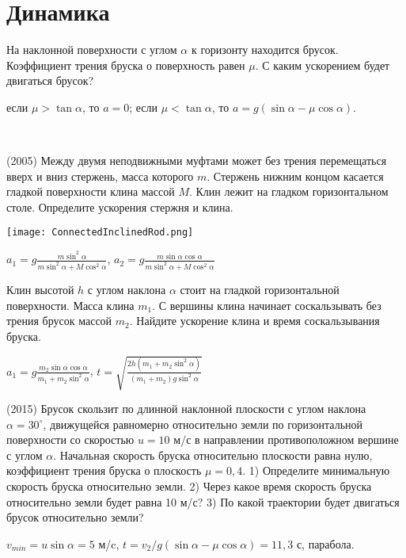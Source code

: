 \section{Динамика}
 
\begin{ex}
На наклонной поверхности с углом $\alpha$ к горизонту находится брусок. 
Коэффициент трения бруска о поверхность равен $\mu$. С каким ускорением будет двигаться брусок?
\begin{ans}
если $\mu > \tan \alpha$, то $a = 0$; если $\mu < \tan \alpha$, то $a = g(\sin \alpha - \mu \cos \alpha)$.
\end{ans}
\end{ex}

\begin{ex}
\hspace{0pt} \\
\begin{minipage}{.65\textwidth}
(2005) Между двумя неподвижными муфтами может без трения перемещаться вверх и вниз стержень, масса которого $m$. Стержень нижним концом касается гладкой поверхности клина массой $M$. Клин лежит на гладком горизонтальном столе. Определите ускорения стержня и клина.
\end{minipage}
\begin{minipage}{.35\textwidth}
\centering
\texttt{[image: ConnectedInclinedRod.png]}
\end{minipage}
\begin{ans}
$a_1 = g \frac{m \sin^2 \alpha}{m \sin^2 \alpha + M \cos^2 \alpha}$, $a_2 = g\frac{m \sin \alpha \cos \alpha}{m \sin^2 \alpha + M \cos^2 \alpha}$
\end{ans}
\end{ex}

\begin{ex}
Клин высотой $h$ с углом наклона $\alpha$ стоит на гладкой горизонтальной поверхности. Масса клина $m_1$. С вершины клина начинает соскальзывать без трения брусок массой $m_2$. Найдите ускорение клина и время соскальзывания бруска.
\begin{ans}
$a_1 = g \frac{m_2 \sin \alpha \cos \alpha}{m_1 + m_2 \sin^2 \alpha}$, $t=\sqrt{\frac{2h(m_1+m_2\sin^2\alpha)}{(m_1+m_2)g \sin^2 \alpha}}$
\end{ans}
\end{ex}

\begin{ex}
(2015) Брусок скользит по длинной наклонной плоскости с углом наклона $\alpha = 30^{\circ}$, движущейся равномерно относительно земли по горизонтальной поверхности со скоростью $u = 10$ м/с в направлении противоположном вершине с углом $\alpha$. Начальная скорость бруска относительно плоскости равна нулю, коэффициент трения бруска о плоскость $\mu = 0,4$. 1) Определите минимальную скорость бруска относительно земли. 2) Через какое время скорость бруска относительно земли будет равна 10 м/с? 3) По какой траектории будет двигаться брусок относительно земли?
\begin{ans}
$v_{min} = u \sin \alpha = 5$ м/c, $t = v_2/g(\sin \alpha - \mu \cos \alpha) = 11,3$ с, парабола.
\end{ans}
\end{ex}

